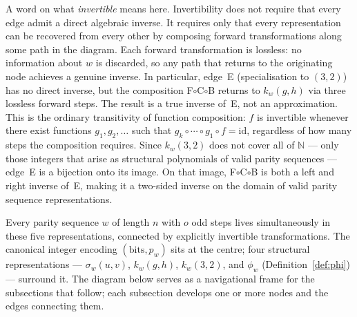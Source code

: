 \documentclass[12pt]{article}
\theoremstyle{definition}
\theoremstyle{remark}
\newcommand{\kpoly}{k}
\begin{document}
A word on what \emph{invertible} means here.  Invertibility does not
require that every edge admit a direct algebraic inverse.  It requires
only that every representation can be recovered from every other by
composing forward transformations along some path in the diagram.  Each
forward transformation is lossless: no information about $w$ is discarded,
so any path that returns to the originating node achieves a genuine
inverse.  In particular, edge~E (specialisation to $(3,2)$) has no direct
inverse, but the composition F$\circ$C$\circ$B returns to $\kpoly_w(g,h)$
via three lossless forward steps.  The result is a true inverse of~E,
not an approximation.  This is the ordinary transitivity of function
composition: $f$ is invertible whenever there exist functions $g_1, g_2,
\ldots$ such that $g_k \circ \cdots \circ g_1 \circ f = \mathrm{id}$,
regardless of how many steps the composition requires.  Since $\kpoly_w(3,2)$ does not cover all of $\mathbb{N}$ — only those
integers that arise as structural polynomials of valid parity sequences —
edge~E is a bijection onto its image.  On that image, F$\circ$C$\circ$B
is both a left and right inverse of~E, making it a two-sided inverse on
the domain of valid parity sequence representations.

Every parity sequence $w$ of length $n$ with $o$ odd steps lives simultaneously
in these five representations, connected by explicitly invertible
transformations.  The canonical integer
encoding $(\text{bits}, p_w)$ sits at the centre; four structural
representations --- $\sigma_w(u,v)$, $\kpoly_w(g,h)$, $\kpoly_w(3,2)$, and
$\phi_w$ (Definition~\ref{def:phi}) --- surround it.  The diagram below serves
as a navigational frame for the subsections that follow; each subsection
develops one or more nodes and the edges connecting them.

\begin{center}
\end{center}
\end{document}
